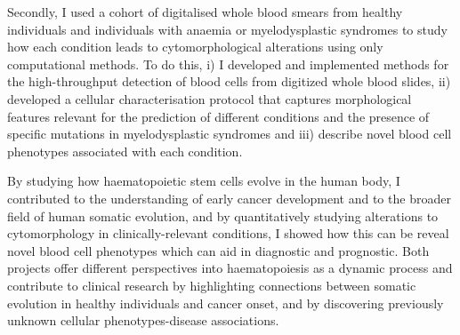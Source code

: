 Secondly, I used a cohort of digitalised whole blood smears from healthy individuals and individuals with anaemia or myelodysplastic syndromes to study how each condition leads to cytomorphological alterations using only computational methods. To do this, i) I developed and implemented methods for the high-throughput detection of blood cells from digitized whole blood slides, ii) developed a cellular characterisation protocol that captures morphological features relevant for the prediction of different conditions and the presence of specific mutations in myelodysplastic syndromes and iii) describe novel blood cell phenotypes associated with each condition.

By studying how haematopoietic stem cells evolve in the human body, I contributed to the understanding of early cancer development and to the broader field of human somatic evolution, and by quantitatively studying alterations to cytomorphology in clinically-relevant conditions, I showed how this can be reveal novel blood cell phenotypes which can aid in diagnostic and prognostic. Both projects offer different perspectives into haematopoiesis as a dynamic process and contribute to clinical research by highlighting connections between somatic evolution in healthy individuals and cancer onset, and by discovering previously unknown cellular phenotypes-disease associations.

